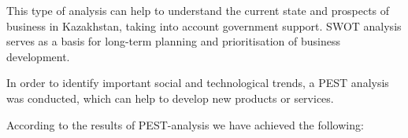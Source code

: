 This type of analysis can help to understand the current state and
prospects of business in Kazakhstan, taking into account government
support. SWOT analysis serves as a basis for long-term planning and
prioritisation of business development.

In order to identify important social and technological trends, a PEST
analysis was conducted, which can help to develop new products or
services.

According to the results of PEST-analysis we have achieved the
following:

% 
% 
% 
% 
% 
% 
% 
